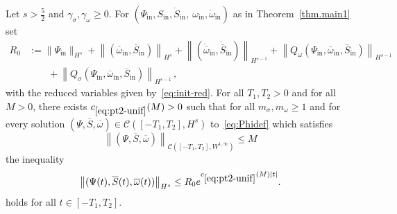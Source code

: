 \documentclass[AHL,Unicode,longabstracts,published]{cedram}
\newcommand{\rmin}{\mathrm{in}}
\newcommand{\cC}{\mathcal{C}}
\begin{document}
\begin{lemm}\label{lem:unif-exist}
Let $s>\tfrac52$ and $\gamma_\sigma, \gamma_\omega\geq 0$. For $(\Psi_\rmin, S_\rmin, \dot S_\rmin, \ \omega_\rmin, \dot \omega_\rmin)$ as in Theorem~\ref{thm.main1} set
\begin{align*}
R_0&:= \|\Psi_\rmin\|_{H^s} +\left\|(\overline{\omega}_\rmin, \overline{S}_\rmin)\right\|_{H^s} + \left\|(\dot{\overline{\omega}}_\rmin, \dot{\overline{S}}_\rmin)\right\|_{H^{s-1}} +\left\|Q_\omega(\Psi_\rmin, \overline{\omega}_\rmin, \overline{S}_\rmin)\right\|_{H^{s-1}}\\
&\qquad+ \left\|Q_\sigma(\Psi_\rmin, \overline{\omega}_\rmin, \overline{S}_\rmin)\right\|_{H^{s-1}}\,,
\end{align*}
with the reduced variables given by~\eqref{eq:init-red}. For all $T_1,T_2>0$ and for all $M>0$, there exists $c_{\eqref{eq:pt2-unif}}(M)>0$ such that for all $m_\sigma,m_\omega \geq 1$ and for every solution $(\Psi, \overline{S},\overline{\omega})\in \cC([-T_1, T_2],H^s)$ to~\eqref{eq:Phidef} which satisfies
\begin{equation*}
\left\|(\Psi, \overline{S},\overline{\omega})\right\|_{\cC\left([-T_1,T_2],W^{1,\infty}\right)} \leq M
\end{equation*}
the inequality
\begin{equation}\label{eq:pt2-unif}
\left\|(\Psi(t), \overline{S}(t), \overline{\omega}(t))\right\|_{H^s} \leq R_0 e^{c_{\eqref{eq:pt2-unif}}(M) |t|}.
\end{equation}
holds for all $t\in [-T_1, T_2]$.
\end{lemm}
\end{document}
